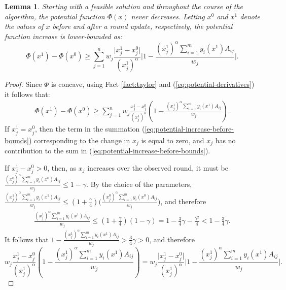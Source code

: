\documentclass[11pt]{article}
\newtheorem{lemma}[theorem]{Lemma}
\newif\iffullpaper
\begin{document}
\begin{lemma}\label{lemma:potential-increase}
Starting with a feasible solution and throughout the course of the algorithm, the potential function $\Phi(x)$ never decreases. Letting $x^0$ and $x^1$ denote the values of $x$ before and after a round update, respectively, the potential function increase is lower-bounded as:
\begin{equation*}
\Phi(x^1) -\Phi(x^0) \geq \sum_{j=1}^n w_j \frac{\big|x_j^1 - x_j^0\big|}{(x_j^1)^{\alpha}}\Big|1 - \frac{(x_j^1)^{\alpha}\sum_{i=1}^my_i(x^1)A_{ij}}{w_j} \Big|. \label{eq:general-potential-increase}
\end{equation*}
\end{lemma}
\iffullpaper
\begin{proof}
Since $\Phi$ is concave, using Fact \ref{fact:taylor} and (\ref{eq:potential-derivatives}) it follows that:
\begin{align}
\Phi(x^1) - \Phi(x^0) \geq \sum_{j=1}^n w_j \frac{x_j^1 - x_j^0}{(x_j^1)^{\alpha}}\left(1 - \frac{(x_j^1)^{\alpha}\sum_{i=1}^my_i(x^1)A_{ij}}{w_j} \right).\label{eq:potential-increase-before-bounds}
\end{align}
If $x_j^1 = x_j^0$, then the term in the summation (\ref{eq:potential-increase-before-bounds}) corresponding to the change in $x_j$ is equal to zero, and $x_j$ has no contribution to the sum in (\ref{eq:potential-increase-before-bounds}). 

If $x_j^1 - x_j^0 > 0$, then, as $x_j$ increases over the observed round, it must be $\frac{(x_j^0)^{\alpha}\sum_{i=1}^my_i(x^0)A_{ij}}{w_j}\leq 1-\gamma$. By the choice of the parameters, $\frac{(x_j^1)^{\alpha}\sum_{i=1}^my_i(x^1)A_{ij}}{w_j}\leq \left(1+\frac{\gamma}{4}\right)\Big(\frac{(x_j^0)^{\alpha}\sum_{i=1}^my_i(x^0)A_{ij}}{w_j}\Big)$, and therefore
\begin{align}
\frac{(x_j^1)^{\alpha}\sum_{i=1}^my_i(x^1)A_{ij}}{w_j}\leq \left(1+\frac{\gamma}{4}\right)(1-\gamma) = 1 - \frac{3}{4}\gamma - \frac{\gamma^2}{4}
<1 - \frac{3}{4}\gamma. \label{eq:alpha<1-zj-increase}
\end{align}
It follows that $1 - \frac{(x_j^1)^{\alpha}\sum_{i=1}^my_i(x^1)A_{ij}}{w_j}>\frac{3}{4}\gamma>0$, and therefore 
\begin{equation*}
w_j \frac{x_j^1 - x_j^0}{(x_j^1)^{\alpha}}\left(1 - \frac{(x_j^1)^{\alpha}\sum_{i=1}^my_i(x^1)A_{ij}}{w_j} \right) = w_j \frac{\big|x_j^1 - x_j^0\big|}{(x_j^1)^{\alpha}}\Bigg|1 - \frac{(x_j^1)^{\alpha}\sum_{i=1}^my_i(x^1)A_{ij}}{w_j} \Bigg|.
\end{equation*}


\end{proof}
\end{document}
